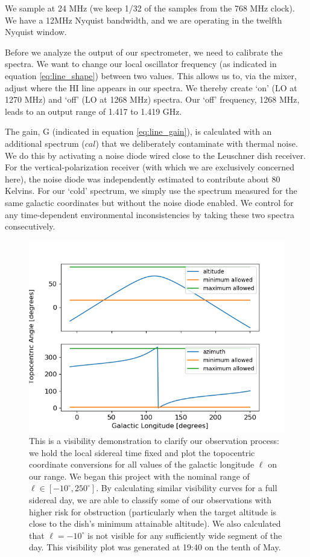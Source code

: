 \documentclass[12pt]{article}
\begin{document}
We sample at 24 MHz (we keep 1/32 of the samples from the 768 MHz clock). We have a 12MHz Nyquist bandwidth, and we are operating in the twelfth Nyquist window.

Before we analyze the output of our spectrometer, we need to calibrate the spectra. We want to change our local oscillator frequency (as indicated in equation \ref{eq:line_shape}) between two values. This allows us to, via the mixer, adjust where the HI line appears in our spectra. We thereby create `on' (LO at 1270 MHz) and `off' (LO at 1268 MHz) spectra. Our `off' frequency, 1268 MHz, leads to an output range of 1.417 to 1.419 GHz. 

The gain, G (indicated in equation \ref{eq:line_gain}), is calculated with an additional spectrum ($cal$) that we deliberately contaminate with thermal noise. We do this by activating a noise diode wired close to the Leuschner dish receiver. For the vertical-polarization receiver (with which we are exclusively concerned here), the noise diode was independently estimated to contribute about 80 Kelvins. For our `cold' spectrum, we simply use the spectrum measured for the same galactic coordinates but without the noise diode enabled. We control for any time-dependent environmental inconsistencies by taking these two spectra consecutively.

\begin{figure}
	\centering
	\includegraphics[width=.75\linewidth]{1940_10_05_2020}
	\caption{This is a visibility demonstration to clarify our observation process: we hold the local sidereal time fixed and plot the topocentric coordinate conversions for all values of the galactic longitude $\ell$ on our range. We began this project with the nominal range of $\ell \in [-10^\circ, 250^\circ]$. By calculating similar visibility curves for a full sidereal day, we are able to classify some of our observations with higher risk for obstruction (particularly when the target altitude is close to the dish's minimum attainable altitude). We also calculated that $\ell=-10^\circ$ is not visible for any sufficiently wide segment of the day. This visibility plot was generated at 19:40 on the tenth of May.}
	\label{fig:vis_demo}
\end{figure}
\end{document}
